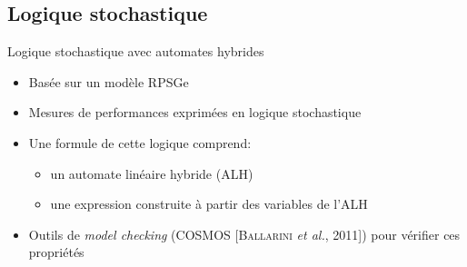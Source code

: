 \documentclass[aspectratio=43]{beamer} %
\begin{document}
\subsection[LSAH]{Logique stochastique}
\begin{frame}{Logique stochastique avec automates hybrides}
  \begin{small}
    \begin{itemize}
      \item Basée sur un modèle RPSGe
      \item Mesures de performances exprimées en \alert{logique stochastique}
      \item Une formule de cette logique comprend:
        \begin{itemize}
          \item un \alert{automate linéaire hybride} (ALH)
          \item une \alert{expression} construite à partir des variables de l'ALH
        \end{itemize}
      \item Outils de \alert{\textit{model checking}} (COSMOS [\textsc{Ballarini} \textit{et al.}, 2011]) pour vérifier ces propriétés
    \end{itemize}
  \end{small}
  \begin{minipage}{.69\textwidth}
    \begin{tiny}
\end{tiny}
\end{minipage}
\end{frame}
\end{document}
